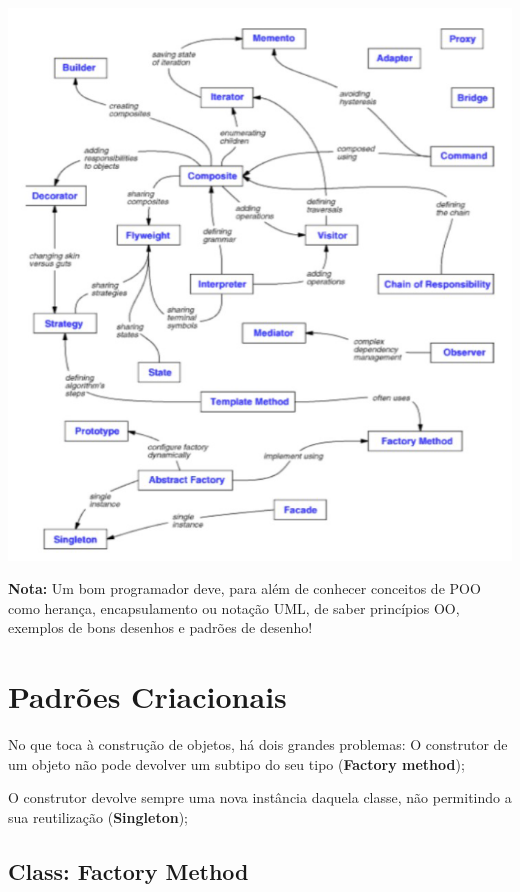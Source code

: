 \documentclass{article}
\begin{document}
\begin{center}
    \includegraphics[scale=0.3]{Images/23.png}
\end{center}

\pagebreak

\begin{flushleft}
    \textbf{Nota:} Um bom programador deve, para além de conhecer conceitos de POO como herança, encapsulamento ou
    notação UML, de saber princípios OO, exemplos de bons desenhos e padrões de desenho!
\end{flushleft}


\section{Padrões Criacionais}

No que toca à construção de objetos, há dois grandes problemas:
O construtor de um objeto não pode devolver um subtipo do seu tipo (\textbf{Factory method}); 

\vspace{2mm}
O construtor devolve sempre uma nova instância daquela classe, não
permitindo a sua reutilização (\textbf{Singleton});

\subsection{Class: Factory Method}
\end{document}
